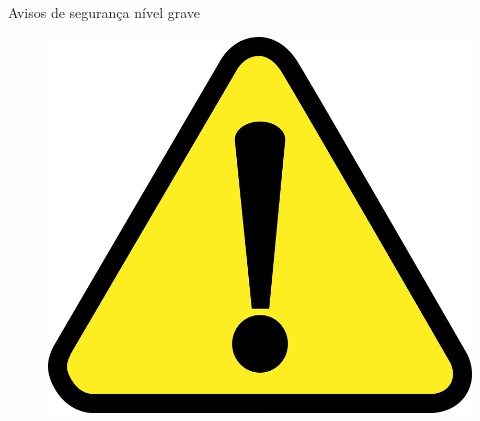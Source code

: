 \begin{center}
    Avisos de segurança nível grave

\begin{figure}[H]
\centering
\includegraphics[scale = 0.1]{Figuras/atenção.png}
\end{figure}
\end{center}


